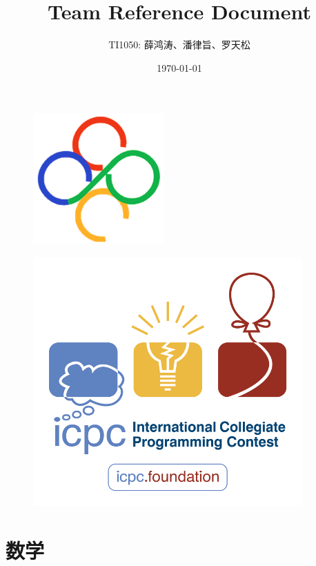

\title{\yihao\hei Team Reference Document}
\author{TI1050: 薛鸿涛、潘律旨、罗天松}
\date{\today}



\maketitle %
\begin{figure}[ht]
\centering  %
\includegraphics[scale=0.70]{images/ccpc_logo.png} %
\end{figure}
\begin{figure}[ht]
\centering  %
\includegraphics[scale=0.65]{images/icpc_logo.png} %
\end{figure}

\newpage %
\tableofcontents
\newpage

\section{数学}

